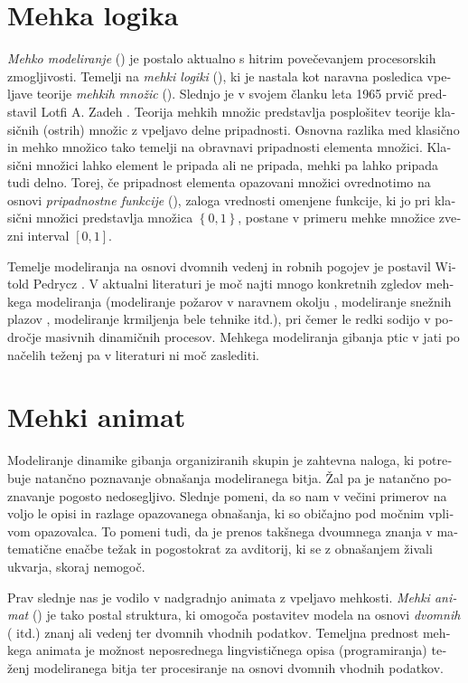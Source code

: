 \begin{slovenian}
\section{Mehka logika}
\emph{Mehko modeliranje} () je postalo aktualno s hitrim povečevanjem procesorskih zmogljivosti. Temelji na \emph{mehki logiki} (), ki je nastala kot naravna posledica vpeljave teorije \emph{mehkih množic} (). Slednjo je v svojem članku leta 1965 prvič predstavil Lotfi A. Zadeh \cite{zadeh:1965}. Teorija mehkih množic predstavlja posplošitev teorije klasičnih (ostrih) množic z vpeljavo delne pripadnosti. Osnovna razlika med klasično in mehko množico tako temelji na obravnavi pripadnosti elementa množici. Klasični množici lahko element le pripada ali ne pripada, mehki pa lahko pripada tudi delno. Torej, če pripadnost elementa opazovani množici ovrednotimo na osnovi \emph{pripadnostne funkcije} (), zaloga vrednosti omenjene funkcije, ki jo pri klasični množici predstavlja množica $\left\{0,1\right\}$, postane v primeru mehke množice zvezni interval $\left[0,1\right]$.

Temelje modeliranja na osnovi dvomnih vedenj in robnih pogojev je postavil Witold Pedrycz \cite{pedrycz:1993}. V aktualni literaturi je moč najti mnogo konkretnih zgledov mehkega modeliranja (modeliranje požarov v naravnem okolju \cite{mraz:1999,vakalis:2004a,vakalis:2004b}, modeliranje snežnih plazov \cite{barpi:2004}, modeliranje krmiljenja bele tehnike \cite{mraz:2001} itd.), pri čemer le redki sodijo v področje masivnih dinamičnih procesov. Mehkega modeliranja gibanja ptic v jati po načelih teženj pa v literaturi ni moč zaslediti. 

\section{Mehki animat}
Modeliranje dinamike gibanja organiziranih skupin je zahtevna naloga, ki potrebuje natančno poznavanje obnašanja modeliranega bitja. Žal pa je natančno poznavanje pogosto nedosegljivo. Slednje pomeni, da so nam v večini primerov na voljo le opisi in razlage opazovanega obnašanja, ki so običajno pod močnim vplivom opazovalca. To pomeni tudi, da je prenos takšnega dvoumnega znanja v matematične enačbe težak in pogostokrat za avditorij, ki se z obnašanjem živali ukvarja, skoraj nemogoč. 

Prav slednje nas je vodilo v nadgradnjo animata z vpeljavo mehkosti. \emph{Mehki animat} () je tako postal struktura, ki omogoča postavitev modela na osnovi \emph{dvomnih} ( itd.) znanj ali vedenj ter dvomnih vhodnih podatkov. Temeljna prednost mehkega animata je možnost neposrednega lingvističnega opisa (programiranja) teženj modeliranega bitja ter procesiranje na osnovi dvomnih vhodnih podatkov. 


\end{slovenian}
